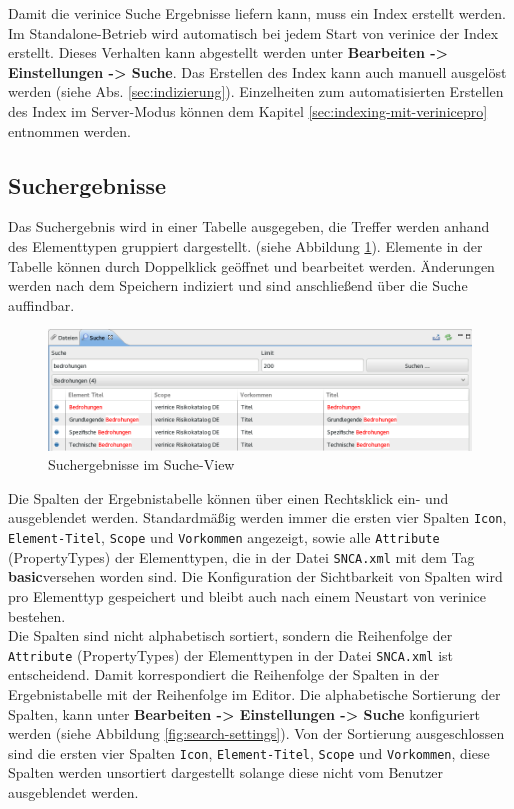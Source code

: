 \documentclass[a4paper,10pt]{book}
\begin{document}
Damit die verinice Suche Ergebnisse liefern kann, muss ein Index
erstellt werden. Im Standalone-Betrieb wird automatisch bei jedem
Start von verinice der Index erstellt. Dieses Verhalten kann
abgestellt werden unter \textbf{Bearbeiten -> Einstellungen ->
  Suche}. Das Erstellen des Index kann auch manuell ausgelöst werden
(siehe Abs. \ref{sec:indizierung}). Einzelheiten zum automatisierten
Erstellen des Index im Server-Modus können dem Kapitel
\ref{sec:indexing-mit-verinicepro} entnommen werden.

\subsection{Suchergebnisse}
\label{sec:suchergebnisse}

Das Suchergebnis wird in einer Tabelle ausgegeben, die Treffer
werden anhand des Elementtypen gruppiert dargestellt. (siehe Abbildung
\ref{fig:search-view}). Elemente in der Tabelle können durch
Doppelklick geöffnet und bearbeitet werden. Änderungen
werden nach dem Speichern indiziert
und sind anschließend über die Suche auffindbar.\\

\begin{figure}[ht]
  \centering
  \includegraphics[width=.9\textwidth]{Screenshot/search-view.png}
  \caption{Suchergebnisse im Suche-View}
  \label{fig:search-view}
\end{figure}

Die Spalten der Ergebnistabelle können über einen Rechtsklick ein- und
ausgeblendet werden. Standardmäßig werden immer die ersten vier
Spalten \texttt{Icon}, \texttt{Element-Titel}, \texttt{Scope} und
\texttt{Vorkommen} angezeigt, sowie alle \texttt{Attribute}
(PropertyTypes) der Elementtypen, die in der Datei \texttt{SNCA.xml}
mit dem Tag \glqq \textbf{basic}\grqq versehen worden sind. Die
Konfiguration der Sichtbarkeit von Spalten wird pro Elementtyp
gespeichert und bleibt auch nach einem Neustart von verinice bestehen.\\

Die Spalten sind nicht alphabetisch sortiert, sondern die
Rei\-hen\-fol\-ge der \texttt{Attribute} (Proper\-ty\-Types) der
Elementtypen in der Datei \texttt{SNCA.xml} ist entscheidend. Damit
korrespondiert die Reihenfolge der Spalten in der Ergebnistabelle mit
der Reihenfolge im Editor. Die alphabetische Sortierung der Spalten,
kann unter \textbf{Bearbeiten -> Einstellungen -> Suche} konfiguriert
werden (siehe Abbildung \ref{fig:search-settings}). Von der Sortierung
ausgeschlossen sind die ersten vier Spalten \texttt{Icon},
\texttt{Element-Titel}, \texttt{Scope} und \texttt{Vorkommen}, diese
Spalten werden unsortiert dargestellt solange diese nicht vom Benutzer
ausgeblendet werden.
\end{document}

